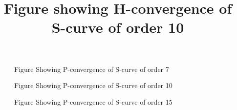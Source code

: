 \documentclass[11pt,letterpaper]{article}
\begin{document}
\title{{\bfseries Figure showing H-convergence of S-curve of order 10}}


\begin{figure}[h]
\begin{center}
\caption{\label{crvconvf4}Figure Showing P-convergence of S-curve
of order 7}
\end{center}
\end{figure}

\begin{figure}[h]
\begin{center}
\caption{\label{crvconvf4}Figure Showing P-convergence of S-curve
of order 10}
\end{center}
\end{figure}


\begin{figure}[h]
\begin{center}
\caption{\label{crvconvf4}Figure Showing P-convergence of S-curve
of order 15}
\end{center}
\end{figure}
\end{document}
